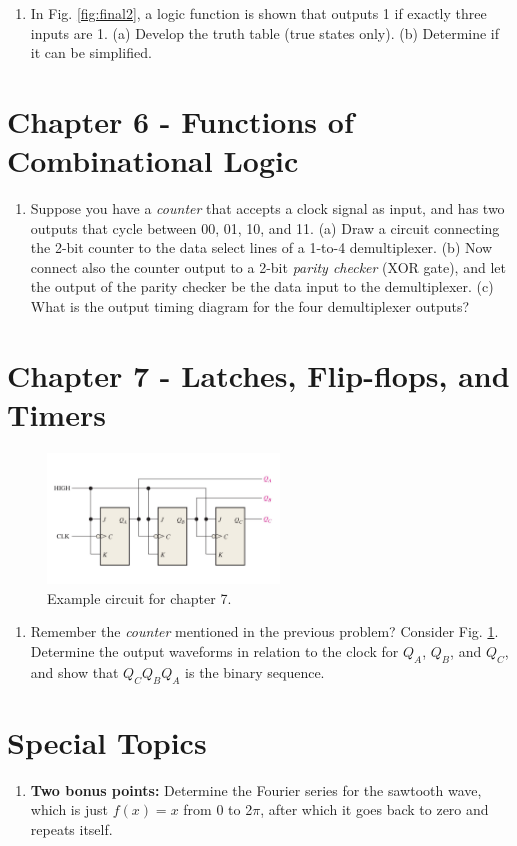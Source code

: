 \documentclass[10pt]{article}
\begin{document}
\begin{enumerate}
\item In Fig. \ref{fig:final2}, a logic function is shown that outputs 1 if exactly three inputs are 1.  (a) Develop the truth table (true states only). (b) Determine if it can be simplified. \\ \vspace{2cm}
\end{enumerate}

\section{Chapter 6 - Functions of Combinational Logic}

\begin{enumerate}
\item Suppose you have a \textit{counter} that accepts a clock signal as input, and has two outputs that cycle between 00, 01, 10, and 11.  (a) Draw a circuit connecting the 2-bit counter to the data select lines of a 1-to-4 demultiplexer.  (b) Now connect also the counter output to a 2-bit \textit{parity checker} (XOR gate), and let the output of the parity checker be the data input to the demultiplexer.  (c) What is the output timing diagram for the four demultiplexer outputs? \\ \vspace{4cm}
\end{enumerate}

\section{Chapter 7 - Latches, Flip-flops, and Timers}

\begin{figure}
\centering
\includegraphics[width=0.55\textwidth]{figures/final3.pdf}
\caption{\label{fig:final3} Example circuit for chapter 7.}
\end{figure}

\begin{enumerate}
\item Remember the \textit{counter} mentioned in the previous problem?  Consider Fig. \ref{fig:final3}.  Determine the output waveforms in relation to the clock for $Q_A$, $Q_B$, and $Q_C$, and show that $Q_C Q_B Q_A$ is the binary sequence. \\ \vspace{3cm}
\end{enumerate}

\section{Special Topics}

\begin{enumerate}
\item \textbf{Two bonus points:} Determine the Fourier series for the sawtooth wave, which is just $f(x) = x$ from 0 to 2$\pi$, after which it goes back to zero and repeats itself.
\end{enumerate}
\end{document}
